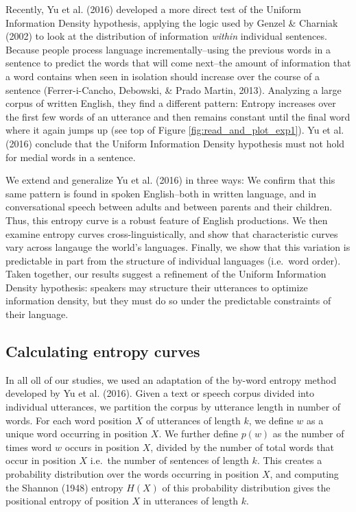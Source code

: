 \documentclass[10pt, letterpaper]{article}
\begin{document}
Recently, Yu et al. (2016) developed a more direct test of the Uniform
Information Density hypothesis, applying the logic used by Genzel \&
Charniak (2002) to look at the distribution of information \emph{within}
individual sentences. Because people process language
incrementally--using the previous words in a sentence to predict the
words that will come next--the amount of information that a word
contains when seen in isolation should increase over the course of a
sentence (Ferrer-i-Cancho, Debowski, \& Prado Martin, 2013). Analyzing a
large corpus of written English, they find a different pattern: Entropy
increases over the first few words of an utterance and then remains
constant until the final word where it again jumps up (see top of Figure
\ref{fig:read_and_plot_exp1}). Yu et al. (2016) conclude that the
Uniform Information Density hypothesis must not hold for medial words in
a sentence.

We extend and generalize Yu et al. (2016) in three ways: We confirm that
this same pattern is found in spoken English--both in written language,
and in conversational speech between adults and between parents and
their children. Thus, this entropy curve is a robust feature of English
productions. We then examine entropy curves cross-linguistically, and
show that characteristic curves vary across langauge the world's
languages. Finally, we show that this variation is predictable in part
from the structure of individual languages (i.e.~word order). Taken
together, our results suggest a refinement of the Uniform Information
Density hypothesis: speakers may structure their utterances to optimize
information density, but they must do so under the predictable
constraints of their language.

\hypertarget{calculating-entropy-curves}{%
\subsection{Calculating entropy
curves}\label{calculating-entropy-curves}}

In all oll of our studies, we used an adaptation of the by-word entropy
method developed by Yu et al. (2016). Given a text or speech corpus
divided into individual utterances, we partition the corpus by utterance
length in number of words. For each word position \(X\) of utterances of
length \(k\), we define \(w\) as a unique word occurring in position
\(X\). We further define \(p(w)\) as the number of times word \(w\)
occurs in position \(X\), divided by the number of total words that
occur in position \(X\) i.e.~the number of sentences of length \(k\).
This creates a probability distribution over the words occurring in
position \(X\), and computing the Shannon (1948) entropy \(H(X)\) of
this probability distribution gives the positional entropy of position
\(X\) in utterances of length \(k\).
\end{document}
